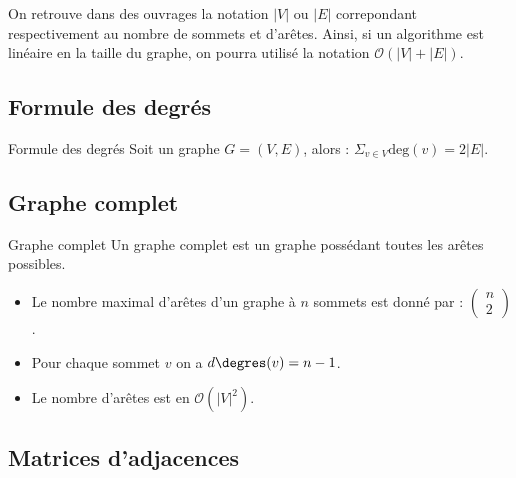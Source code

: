 \begin{rem}
On retrouve dans des ouvrages la notation $|V|$ ou $|E|$ correpondant respectivement au nombre de sommets et d'arêtes. 
Ainsi, si un algorithme est linéaire en la taille du graphe, on pourra utilisé la notation $\mathcal{O}\left(|V|+|E|\right)$.
\end{rem}

\subsection{Formule des degrés}
\begin{defi}{Formule des degrés}
Soit un graphe $G=\left(V,E\right)$, alors : $\displaystyle{\Sigma_{v \in V}} \text{deg}(v) = 2|E|$.
\end{defi}

\subsection{Graphe complet}

\begin{defi}{Graphe complet}
Un graphe complet est un graphe possédant toutes les arêtes possibles. 
\end{defi}

\begin{rem}
\begin{itemize}
\item Le nombre maximal d'arêtes d'un graphe à $n$ sommets est donné par : $\begin{pmatrix} n \\ 2\end{pmatrix}$.
\item Pour chaque sommet $v$ on a $d\degres (v) = n-1$.
\item Le nombre d'arêtes est en $\mathcal{O}\left(|V|^2\right)$.
\end{itemize}
\end{rem}

\subsection{Matrices d'adjacences}

